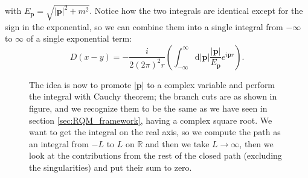 with \(E_{\mathbf{p}} = \sqrt{\vert \mathbf{p} \vert^2 + m^2}\). Notice how the two integrals are identical except for the sign in the exponential, so we can combine them into a single integral from \(-\infty\) to \(\infty\) of a single exponential term:
\[
    D(x-y) = -\frac{i}{2(2\pi)^2 r} \left( \int_{-\infty}^{\infty} \mathrm{d} \vert \mathbf{p} \vert \frac{\vert \mathbf{p} \vert }{E_{\mathbf{p}} }e^{i \mathbf{p} r} \right).
\]
\begin{figure}[H]
    \centering
    \begin{minipage}{0.45\textwidth}
        \centering
    \end{minipage}
    \hfill
    \begin{minipage}{0.5\textwidth}
        The idea is now to promote \(\vert \mathbf{p} \vert\) to a complex variable and perform the integral with Cauchy theorem; the branch cuts are as shown in figure, and we recognize them to be the same as we have seen in section \ref{sec:RQM_framework}, having a complex square root. We want to get the integral on the real axis, so we compute the path as an integral from \(-L\) to \(L\) on \(\mathbb{R}\) and then we take \(L \to \infty\), then we look at the contributions from the rest of the closed path (excluding the singularities) and put their sum to zero.
    \end{minipage}
\end{figure}

